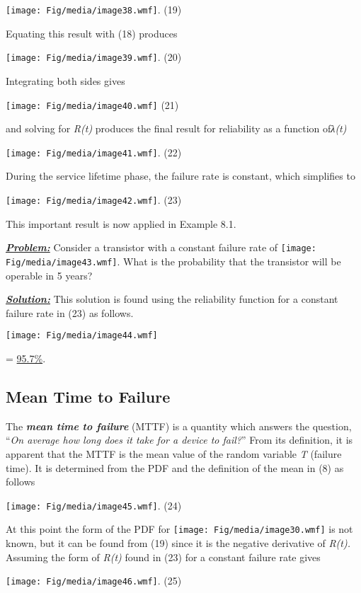 \texttt{[image: Fig/media/image38.wmf]}. (19)

Equating this result with (18) produces

\texttt{[image: Fig/media/image39.wmf]}. (20)

Integrating both sides gives

\texttt{[image: Fig/media/image40.wmf]} (21)

and solving for \emph{R(t)} produces the final result for reliability as
a function of\emph{λ(t)}

\texttt{[image: Fig/media/image41.wmf]}. (22)

During the service lifetime phase, the failure rate is constant, which
simplifies to

\texttt{[image: Fig/media/image42.wmf]}. (23)

This important result is now applied in Example 8.1.

\emph{\textbf{\ul{Problem:}}} Consider a transistor with a constant
failure rate of \texttt{[image: Fig/media/image43.wmf]}. What is the
probability that the transistor will be operable in 5 years?

\emph{\textbf{\ul{Solution:}}} This solution is found using the
reliability function for a constant failure rate in (23) as follows.

\texttt{[image: Fig/media/image44.wmf]}

= \ul{95.7\%}.

\subsection{\texorpdfstring{\hfill\break
Mean Time to
Failure}{ Mean Time to Failure}}\label{mean-time-to-failure}

The \emph{\textbf{mean time to failure}} (MTTF) is a quantity which
answers the question, ``\emph{On average how long does it take for a
device to fail?}'' From its definition, it is apparent that the MTTF is
the mean value of the random variable \emph{T} (failure time). It is
determined from the PDF and the definition of the mean in (8) as follows

\texttt{[image: Fig/media/image45.wmf]}. (24)

At this point the form of the PDF for
\texttt{[image: Fig/media/image30.wmf]} is not known, but it can be
found from (19) since it is the negative derivative of \emph{R(t).}
Assuming the form of \emph{R(t)} found in (23) for a constant failure
rate gives

\texttt{[image: Fig/media/image46.wmf]}. (25)

